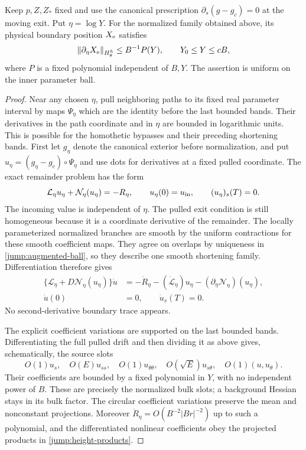 \begin{lemma}\label{jump:moving-exit}
Keep $p,Z,Z_*$ fixed and use the canonical prescription
$\partial_s(g-g_c)=0$ at the moving exit.  Put $\eta=\log Y$.
For the normalized family obtained above, its physical boundary
position $X_{\rm e}$ satisfies
\begin{equation}\label{jump:exit-derivative}
 \|\partial_\eta X_{\rm e}\|_{H^h_\theta}
                 \leq B^{-1}P(Y),\qquad Y_0\leq Y\leq cB,
\end{equation}
where $P$ is a fixed polynomial independent of $B,Y$.  The assertion is uniform on the inner
parameter ball.
\end{lemma}

\begin{proof}
Near any chosen $\eta$, pull neighboring paths to its fixed real
parameter interval by maps $\Psi_\eta$ which are the identity
before the last bounded bands.  Their derivatives in the path
coordinate and in $\eta$ are bounded in logarithmic units.
This is possible for the homothetic bypasses and their preceding
shortening bands.  First let $g_\eta$ denote the canonical exterior
before normalization, and put
$u_\eta=(g_\eta-g_c)\circ\Psi_\eta$ and use dots for derivatives
at a fixed pulled coordinate.  The exact remainder problem has
the form
\[
 \mathcal L_\eta u_\eta+\mathcal N_\eta(u_\eta)=-R_\eta,\qquad
 u_\eta(0)=u_{\rm in},\qquad (u_\eta)_s(T)=0.
\]
The incoming value is independent of $\eta$.  The pulled exit
condition is still homogeneous because it is a coordinate
derivative of the remainder.  The locally parameterized normalized
branches are smooth by the uniform contractions for these smooth
coefficient maps.  They agree on overlaps by uniqueness in
\eqref{jump:augmented-ball}, so they describe one smooth shortening
family.  Differentiation therefore gives
\begin{equation}\label{jump:differentiated-exit-equation}
 \begin{split}
 \{\mathcal L_\eta+D\mathcal N_\eta(u_\eta)\}\dot u
   &=-\dot R_\eta-(\dot{\mathcal L}_\eta)u_\eta
                    -(\partial_\eta\mathcal N_\eta)(u_\eta),\\
 \dot u(0)&=0,\qquad \dot u_s(T)=0 .
 \end{split}
\end{equation}
No second-derivative boundary trace appears.

The explicit coefficient variations are supported on the last
bounded bands.  Differentiating the full pulled drift and then
dividing it as above gives, schematically, the source slots
\[
 O(1)u_s,\quad O(E)u_{ss},\quad O(1)u_{\theta\theta},
 \quad O(\sqrt E)u_{s\theta},\quad O(1)(u,u_\theta).
\]
Their coefficients are bounded by a fixed polynomial in $Y$,
with no independent power of $B$.  These are precisely the normalized
bulk slots; a background Hessian stays in its bulk factor.
The circular coefficient variations preserve the mean and
nonconstant projections.  Moreover
$\dot R_\eta=O(B^{-2}|Br|^{-2})$ up to such a polynomial,
and the differentiated nonlinear coefficients obey the
projected products in \eqref{jump:height-products}.


\end{proof}
